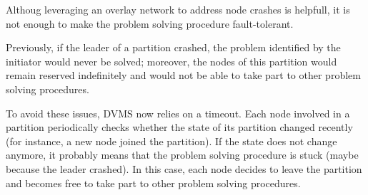 Althoug leveraging an overlay network to address node crashes is
helpfull, it is not enough to make the
problem solving procedure fault-tolerant.

Previously, if the leader of a partition crashed, the problem identified by the
initiator would never be solved; moreover, the nodes of this partition would
remain reserved indefinitely and would not be able to take part to other problem
solving procedures.

To avoid these issues, DVMS now relies on a timeout.  Each node involved in a
partition periodically checks whether the state of its partition changed
recently (for instance, a new node joined the partition).
%
If the state does not change anymore, it probably means that the problem solving
procedure is stuck (maybe because the leader crashed).
%
In this case, each node decides to leave the partition and becomes free to take
part to other problem solving procedures.

